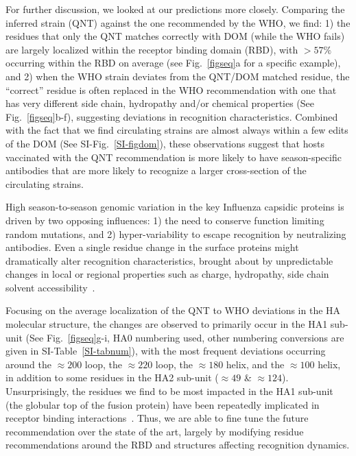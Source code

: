 \documentclass[onecolumn, compsoc,10pt]{IEEEtran}
\begin{document}
For further discussion, we looked at our \qnet predictions more closely. Comparing the \qnet inferred strain (QNT) against the one recommended by the WHO, we find: 1) the residues that only the QNT matches correctly with DOM (while the WHO fails) are largely localized within the receptor binding domain (RBD), with $>57\%$ occurring within  the RBD on average (see Fig.~\ref{figseq}a for a specific example), and 2) when the WHO strain deviates from  the QNT/DOM  matched residue, the ``correct'' residue is often replaced in the WHO recommendation with one that has very different side chain, hydropathy  and/or chemical properties (See Fig.~\ref{figseq}b-f), suggesting deviations in recognition characteristics. Combined with the fact that we find circulating strains are almost always within a few edits of the DOM (See SI-Fig.~\ref{SI-figdom}), these observations suggest that hosts vaccinated with the QNT recommendation is more likely to have season-specific antibodies that are more likely to recognize a larger cross-section of the circulating strains.

High season-to-season genomic variation in the key  Influenza capsidic proteins is driven by two opposing influences: 1) the need to conserve function  limiting random mutations, and 2) hyper-variability to escape recognition by neutralizing antibodies. Even a  single residue change in the surface proteins might dramatically alter recognition characteristics, brought about by unpredictable~\cite{carugo2001normalized,righetto2014comparative} changes in local or regional properties such as charge, hydropathy, side chain solvent accessibility~\cite{lee1971interpretation,shrake1973environment,momen2008impact,adamczak2005combining}.

Focusing on the average localization of the QNT to WHO deviations in the HA molecular  structure, the changes are observed to primarily occur in the HA1 sub-unit (See Fig.~\ref{figseq}g-i, HA0 numbering used, other numbering conversions are given in SI-Table~\ref{SI-tabnum}), with the most frequent deviations  occurring around the $\approx 200$ loop, the $\approx 220$ loop, the $\approx 180$ helix, and the $\approx 100$ helix, in addition to some residues in the HA2 sub-unit ($\approx 49$ \& $\approx 124$). Unsurprisingly, the residues we find to be most impacted in the HA1 sub-unit (the globular top of the fusion protein) have been repeatedly implicated in receptor binding interactions~\cite{tzarum2015structure,lazniewski2018structural,garcia2015dynamic}. Thus, we are able to fine tune the future recommendation over the state of the art, largely by modifying residue recommendations around the RBD and  structures affecting recognition dynamics.
\end{document}
